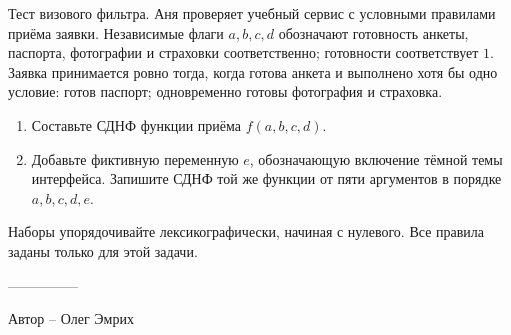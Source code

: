 \question
Тест визового фильтра. Аня проверяет учебный сервис с условными правилами приёма заявки. Независимые флаги $a,b,c,d$ обозначают готовность анкеты, паспорта, фотографии и страховки соответственно; готовности соответствует $1$. Заявка принимается ровно тогда, когда готова анкета и выполнено хотя бы одно условие: готов паспорт; одновременно готовы фотография и страховка.
\begin{enumerate}
\item Составьте СДНФ функции приёма $f(a,b,c,d)$.
\item Добавьте фиктивную переменную $e$, обозначающую включение тёмной темы интерфейса. Запишите СДНФ той же функции от пяти аргументов в порядке $a,b,c,d,e$.
\end{enumerate}
Наборы упорядочивайте лексикографически, начиная с нулевого. Все правила заданы только для этой задачи.

---------------

Автор -- Олег Эмрих
